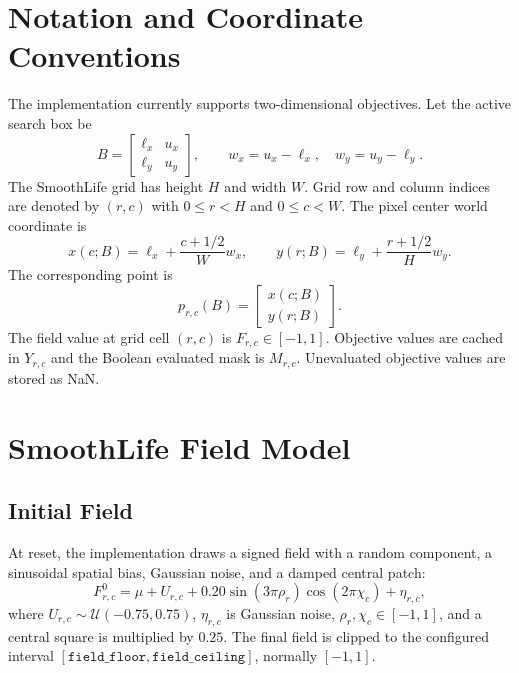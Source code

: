 \documentclass[11pt]{article}
\begin{document}
\section{Notation and Coordinate Conventions}

The implementation currently supports two-dimensional objectives. Let the
active search box be
\begin{equation}
B =
\begin{bmatrix}
\ell_x & u_x \\
\ell_y & u_y
\end{bmatrix},
\qquad
w_x = u_x - \ell_x,\quad w_y = u_y - \ell_y.
\label{eq:bounds}
\end{equation}
The SmoothLife grid has height $H$ and width $W$. Grid row and column indices
are denoted by $(r,c)$ with $0 \le r < H$ and $0 \le c < W$. The pixel center
world coordinate is
\begin{equation}
x(c;B) = \ell_x + \frac{c + 1/2}{W} w_x,
\qquad
y(r;B) = \ell_y + \frac{r + 1/2}{H} w_y.
\label{eq:grid-to-world}
\end{equation}
The corresponding point is
\begin{equation}
p_{r,c}(B) =
\begin{bmatrix}
x(c;B) \\
y(r;B)
\end{bmatrix}.
\label{eq:pixel-point}
\end{equation}
The field value at grid cell $(r,c)$ is $F_{r,c} \in [-1,1]$. Objective values
are cached in $Y_{r,c}$ and the Boolean evaluated mask is $M_{r,c}$.
Unevaluated objective values are stored as NaN.

\section{SmoothLife Field Model}

\subsection{Initial Field}

At reset, the implementation draws a signed field with a random component,
a sinusoidal spatial bias, Gaussian noise, and a damped central patch:
\begin{equation}
F^0_{r,c}
= \mu
+ U_{r,c}
+ 0.20 \sin(3\pi \rho_r)\cos(2\pi \chi_c)
+ \eta_{r,c},
\label{eq:initial-field}
\end{equation}
where $U_{r,c} \sim \mathcal{U}(-0.75,0.75)$, $\eta_{r,c}$ is Gaussian noise,
$\rho_r,\chi_c \in [-1,1]$, and a central square is multiplied by $0.25$.
The final field is clipped to the configured interval
$[\texttt{field\_floor}, \texttt{field\_ceiling}]$, normally $[-1,1]$.
\end{document}
